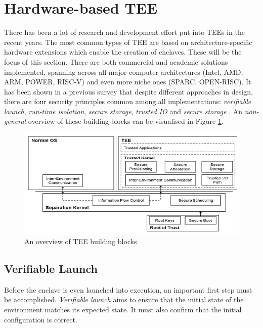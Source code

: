 \documentclass[runningheads,a4paper]{uwsese}
\begin{document}
\section{Hardware-based \gls{TEE}}

There has been a lot of research and development effort put into \glspl{TEE} in
the recent years. The most common types of \gls{TEE} are based on
architecture-specific hardware extensions which enable the creation of
enclaves. These will be the focus of this section. There are both commercial
and academic solutions implemented, spanning across all major computer
architectures (Intel, AMD, ARM, POWER, RISC-V) and even more niche ones (SPARC,
OPEN-RISC). It has been shown in a previous survey that despite different
approaches in design, there are four security principles common among all
implementations: \emph{verifiable launch}, \emph{run-time isolation},
\emph{secure storage}, \emph{trusted IO} and \emph{secure storage}
\cite{tee_hw_sup}. An \emph{non-general} overview of these building blocks can be
visualised in Figure \ref{fig:tee_components}.

\begin{figure}[h]
    \centering
    \includegraphics[scale=.7]{tee_components.png}
    \caption{An overview of \gls{TEE} building blocks \cite{tee_is_and_not}}
    \label{fig:tee_components}
\end{figure}

\subsection{Verifiable Launch}

Before the enclave is even launched into execution, an important first step
must be accomplished. \emph{Verifiable launch} aims to ensure that the initial
state of the environment matches its expected state. It must also confirm that
the initial configuration is correct. 
\end{document}
